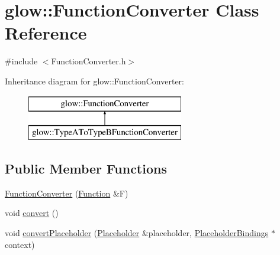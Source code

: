 \hypertarget{classglow_1_1_function_converter}{}\section{glow\+:\+:Function\+Converter Class Reference}
\label{classglow_1_1_function_converter}


{\ttfamily \#include $<$Function\+Converter.\+h$>$}

Inheritance diagram for glow\+:\+:Function\+Converter\+:\begin{figure}[H]
\begin{center}
\leavevmode
\includegraphics[height=2.000000cm]{classglow_1_1_function_converter}
\end{center}
\end{figure}
\subsection*{Public Member Functions}
\begin{DoxyCompactItemize}
\item 
\hyperlink{classglow_1_1_function_converter_a38d2ef15178da614c3ffb48cdeeade76}{Function\+Converter} (\hyperlink{classglow_1_1_function}{Function} \&F)
\item 
void \hyperlink{classglow_1_1_function_converter_ab8873d75c864d9e92359f70424394e70}{convert} ()
\item 
void \hyperlink{classglow_1_1_function_converter_a2cd1261cd954bfdff28d3f7a08136dad}{convert\+Placeholder} (\hyperlink{classglow_1_1_placeholder}{Placeholder} \&placeholder, \hyperlink{classglow_1_1_placeholder_bindings}{Placeholder\+Bindings} $\ast$context)
\end{DoxyCompactItemize}
